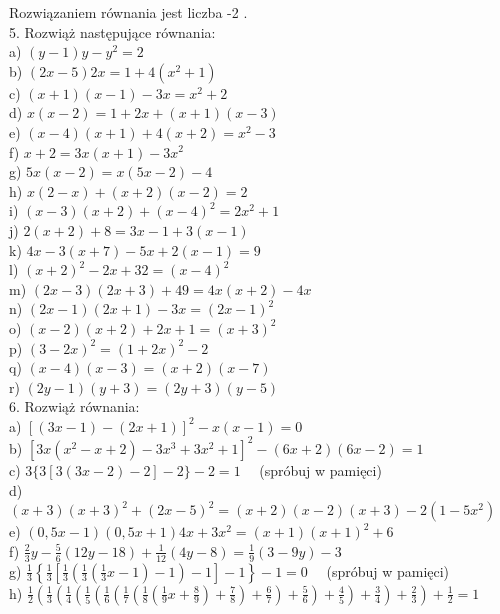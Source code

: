 \documentclass[10pt]{article}
\begin{document}
Rozwiązaniem równania jest liczba -2 .\\
5. Rozwiąż następujące równania:\\
a) \((y-1) y-y^{2}=2\)\\
b) \((2 x-5) 2 x=1+4\left(x^{2}+1\right)\)\\
c) \((x+1)(x-1)-3 x=x^{2}+2\)\\
d) \(x(x-2)=1+2 x+(x+1)(x-3)\)\\
e) \((x-4)(x+1)+4(x+2)=x^{2}-3\)\\
f) \(x+2=3 x(x+1)-3 x^{2}\)\\
g) \(5 x(x-2)=x(5 x-2)-4\)\\
h) \(x(2-x)+(x+2)(x-2)=2\)\\
i) \((x-3)(x+2)+(x-4)^{2}=2 x^{2}+1\)\\
j) \(2(x+2)+8=3 x-1+3(x-1)\)\\
k) \(4 x-3(x+7)-5 x+2(x-1)=9\)\\
l) \((x+2)^{2}-2 x+32=(x-4)^{2}\)\\
m) \((2 x-3)(2 x+3)+49=4 x(x+2)-4 x\)\\
n) \((2 x-1)(2 x+1)-3 x=(2 x-1)^{2}\)\\
o) \((x-2)(x+2)+2 x+1=(x+3)^{2}\)\\
p) \((3-2 x)^{2}=(1+2 x)^{2}-2\)\\
q) \((x-4)(x-3)=(x+2)(x-7)\)\\
r) \((2 y-1)(y+3)=(2 y+3)(y-5)\)\\
6. Rozwiąż równania:\\
a) \([(3 x-1)-(2 x+1)]^{2}-x(x-1)=0\)\\
b) \(\left[3 x\left(x^{2}-x+2\right)-3 x^{3}+3 x^{2}+1\right]^{2}-(6 x+2)(6 x-2)=1\)\\
c) \(3\{3[3(3 x-2)-2]-2\}-2=1 \quad\) (spróbuj w pamięci)\\
d) \((x+3)(x+3)^{2}+(2 x-5)^{2}=(x+2)(x-2)(x+3)-2\left(1-5 x^{2}\right)\)\\
e) \((0,5 x-1)(0,5 x+1) 4 x+3 x^{2}=(x+1)(x+1)^{2}+6\)\\
f) \(\frac{2}{3} y-\frac{5}{6}(12 y-18)+\frac{1}{12}(4 y-8)=\frac{1}{9}(3-9 y)-3\)\\
g) \(\frac{1}{3}\left\{\frac{1}{3}\left[\frac{1}{3}\left(\frac{1}{3}\left(\frac{1}{3} x-1\right)-1\right)-1\right]-1\right\}-1=0 \quad\) (spróbuj w pamięci)\\
h) \(\frac{1}{2}\left(\frac{1}{3}\left(\frac{1}{4}\left(\frac{1}{5}\left(\frac{1}{6}\left(\frac{1}{7}\left(\frac{1}{8}\left(\frac{1}{9} x+\frac{8}{9}\right)+\frac{7}{8}\right)+\frac{6}{7}\right)+\frac{5}{6}\right)+\frac{4}{5}\right)+\frac{3}{4}\right)+\frac{2}{3}\right)+\frac{1}{2}=1\)
\end{document}
